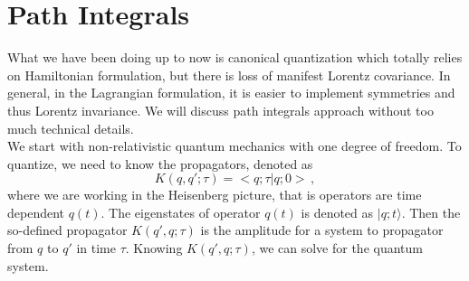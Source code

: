 \documentclass[11pt, onesided]{book}
\theoremstyle{break}
\theoremstyle{break}
\begin{document}
\tableofcontents
\hfill\break
\hfill\break
\hfill\break
 


\newpage
\chapter{Path Integrals}
What we have been doing up to now is canonical quantization which totally relies on Hamiltonian formulation, but there is loss of manifest Lorentz covariance. In general, in the Lagrangian formulation, it is easier to implement symmetries and thus Lorentz invariance. We will discuss path integrals approach without too much technical details. \\

We start with non-relativistic quantum mechanics with one degree of freedom. To quantize, we need to know the propagators, denoted as 
$$K(q,q'; \tau) = <q; \tau | q; 0>\,,$$ where we are working in the Heisenberg picture, that is operators are time dependent $q(t)$. The eigenstates of operator $q(t)$ is denoted as $|q;t\rangle$. Then the so-defined propagator $K(q',q;\tau)$ is the amplitude for a system to propagator from $q$ to $q'$ in time $\tau$. Knowing $K(q',q;\tau)$, we can solve for the quantum system. \\
\end{document}
